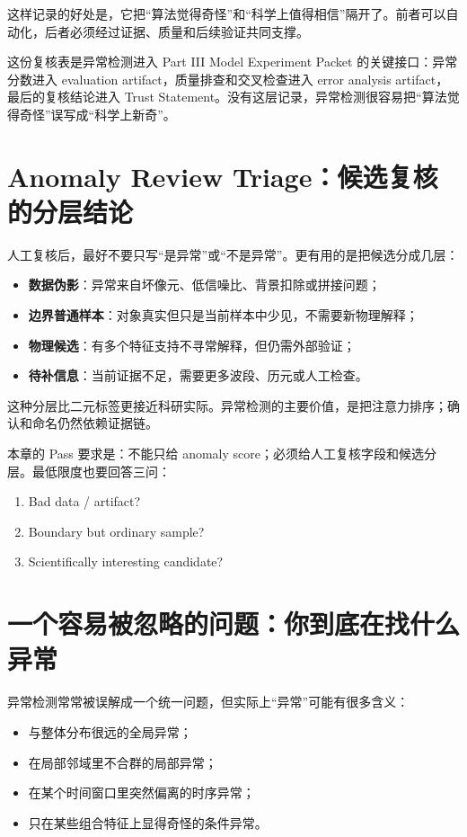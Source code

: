 这样记录的好处是，它把“算法觉得奇怪”和“科学上值得相信”隔开了。前者可以自动化，后者必须经过证据、质量和后续验证共同支撑。

这份复核表是异常检测进入 Part III Model Experiment Packet 的关键接口：异常分数进入 evaluation artifact，质量排查和交叉检查进入 error analysis artifact，最后的复核结论进入 Trust Statement。没有这层记录，异常检测很容易把“算法觉得奇怪”误写成“科学上新奇”。

\section{Anomaly Review Triage：候选复核的分层结论}

人工复核后，最好不要只写“是异常”或“不是异常”。更有用的是把候选分成几层：

\begin{itemize}
    \item \textbf{数据伪影}：异常来自坏像元、低信噪比、背景扣除或拼接问题；
    \item \textbf{边界普通样本}：对象真实但只是当前样本中少见，不需要新物理解释；
    \item \textbf{物理候选}：有多个特征支持不寻常解释，但仍需外部验证；
    \item \textbf{待补信息}：当前证据不足，需要更多波段、历元或人工检查。
\end{itemize}

这种分层比二元标签更接近科研实际。异常检测的主要价值，是把注意力排序；确认和命名仍然依赖证据链。

本章的 Pass 要求是：不能只给 anomaly score；必须给人工复核字段和候选分层。最低限度也要回答三问：

\begin{enumerate}
    \item Bad data / artifact?
    \item Boundary but ordinary sample?
    \item Scientifically interesting candidate?
\end{enumerate}

\section{一个容易被忽略的问题：你到底在找什么异常}

异常检测常常被误解成一个统一问题，但实际上“异常”可能有很多含义：

\begin{itemize}
    \item 与整体分布很远的全局异常；
    \item 在局部邻域里不合群的局部异常；
    \item 在某个时间窗口里突然偏离的时序异常；
    \item 只在某些组合特征上显得奇怪的条件异常。
\end{itemize}

